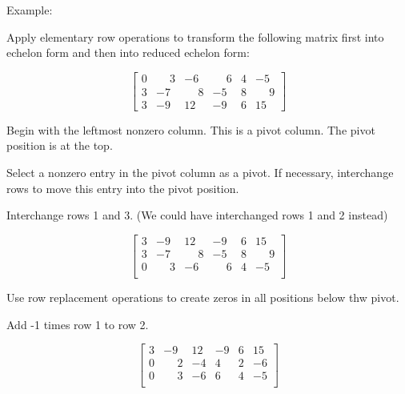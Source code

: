 \documentclass{article}
\begin{document}
\begin{large}
    Example:
\end{large}
Apply elementary row operations to transform the following matrix first into echelon form and then into reduced echelon form: 

\begin{equation*}
    \begin{bmatrix}
        0&\phantom{+}3&-6&\phantom{-}6&4&-5\\
        3&-7&\phantom{-}8&-5&8&\phantom{-}9\\
        3&-9&12&-9&6&15
    \end{bmatrix}
\end{equation*}


\begin{tcolorbox}[colback=green!20!white,colframe=green!80!black,title=Step 1]
    Begin with the leftmost nonzero column. This is a pivot column. The pivot position is at the top.
    \end{tcolorbox}

\begin{tcolorbox}[colback=green!20!white,colframe=green!80!black,title=Step 2]
    Select a nonzero entry in the pivot column as a pivot. If necessary, interchange rows to move this entry into the pivot position.
\end{tcolorbox}

Interchange rows 1 and 3. (We could have interchanged rows 1 and 2 instead)

\begin{equation*}
    \begin{bmatrix}
        3&-9&12&-9&6&15\\
        3&-7&\phantom{-}8&-5&8&\phantom{-}9\\
        0&\phantom{+}3&-6&\phantom{-}6&4&-5\\
    \end{bmatrix}
\end{equation*}

\pagebreak
\begin{tcolorbox}[colback=green!20!white,colframe=green!80!black,title=Step 3]
    Use row replacement operations to create zeros in all positions below thw pivot.
\end{tcolorbox}
Add -1 times row 1 to row 2.

\begin{equation*}
    \begin{bmatrix}
        3&-9&12&-9&6&15\\
        0&\phantom{-}2&-4&4&2&-6\\
        0&\phantom{+}3&-6&6&4&-5\\
    \end{bmatrix}
\end{equation*}
\end{document}
